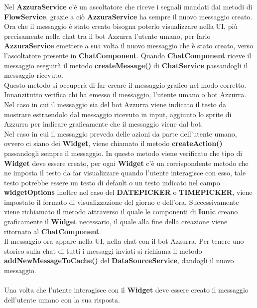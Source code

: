 Nel \textbf{AzzuraService} c'è un ascoltatore che riceve i segnali mandati dai metodi di \textbf{FlowService}, grazie a ciò \textbf{AzzuraService} ha sempre il nuovo messaggio creato. Ora che il messaggio è stato creato bisogna poterlo visualizzare nella UI, più precisamente nella chat tra il bot Azzurra l'utente umano, per farlo \textbf{AzzuraService} emettere a sua volta il nuovo messaggio che è stato creato, verso l'ascoltatore presente in \textbf{ChatComponent}. Quando \textbf{ChatComponent} riceve il messaggio eseguirà il metodo \textbf{createMessage()} di \textbf{ChatService} passandogli il messaggio ricevuto.\\ Questo metodo si occuperà di far creare il messaggio grafico nel modo corretto. Innanzitutto verifica chi ha emesso il messaggio, l'utente umano o bot Azzurra. Nel caso in cui il messaggio sia del bot Azzurra viene indicato il testo da mostrare estraendolo dal messaggio ricevuto in input, aggiunto lo sprite di Azzurra per indicare graficamente che il messaggio viene dal bot.
\\
Nel caso in cui il messaggio preveda delle azioni da parte dell'utente umano, ovvero ci siano dei \textbf{Widget}, viene chiamato il metodo \textbf{createAction()} passandogli sempre il messaggio. In questo metodo viene verificato che tipo di \textbf{Widget} deve essere creato, per ogni \textbf{Widget} c'è un corrispondente metodo che ne imposta il testo da far visualizzare quando l'utente interagisce con esso, tale testo potrebbe essere un testo di default o un testo indicato nel campo \textbf{widgetOptions} inoltre nel caso del \textbf{DATEPICKER} o \textbf{TIMEPICKER}, viene impostato il formato di visualizzazione del giorno e dell'ora. Successivamente viene richiamato il metodo attraverso il quale le componenti di \textbf{Ionic} creano graficamente il \textbf{Widget} necessario, il quale alla fine della creazione viene ritornato al \textbf{ChatComponent}.
\\
Il messaggio ora appare nella UI, nella chat con il bot Azzurra. Per tenere uno storico sulla chat di tutti i messaggi inviati si richiama il metodo \textbf{addNewMessageToCache()} del \textbf{DataSourceService}, dandogli il nuovo messaggio. \\
\\
Una volta che l'utente interagisce con il \textbf{Widget} deve essere creato il messaggio dell'utente umano con la sua risposta. 

\pagebreak


